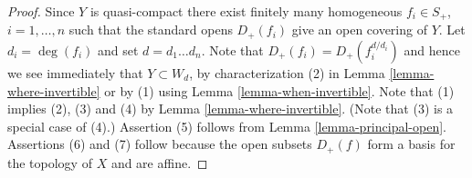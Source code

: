 \documentclass{stacks-project}
\theoremstyle{plain}
\theoremstyle{definition}
\theoremstyle{remark}
\numberwithin{equation}{subsection}
\begin{document}
\begin{proof}
Since $Y$ is quasi-compact there exist finitely many homogeneous
$f_i \in S_{+}$, $i = 1, \ldots, n$ such that the standard opens
$D_{+}(f_i)$ give an open covering of $Y$. Let $d_i = \deg(f_i)$ and set
$d = d_1 \ldots d_n$. Note that $D_{+}(f_i) = D_{+}(f_i^{d/d_i})$
and hence we see immediately that $Y \subset W_d$, by characterization
(2) in Lemma \ref{lemma-where-invertible} or
by (1) using Lemma \ref{lemma-when-invertible}.
Note that (1) implies (2), (3) and (4) by Lemma \ref{lemma-where-invertible}.
(Note that (3) is a special case of (4).)
Assertion (5) follows from Lemma \ref{lemma-principal-open}.
Assertions (6) and (7) follow because the open subsets $D_{+}(f)$
form a basis for the topology of $X$ and are affine.
\end{proof}
\end{document}
